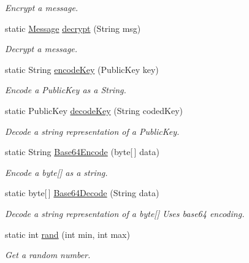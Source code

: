 \begin{DoxyCompactItemize}
\begin{DoxyCompactList}\small\item\em Encrypt a message. \end{DoxyCompactList}\item 
static \hyperlink{classballmerpeak_1_1turtlenet_1_1shared_1_1Message}{Message} \hyperlink{classballmerpeak_1_1turtlenet_1_1server_1_1Crypto_a74c30e340ade0ff1729abe05c772d3f7}{decrypt} (String msg)
\begin{DoxyCompactList}\small\item\em Decrypt a message. \end{DoxyCompactList}\item 
static String \hyperlink{classballmerpeak_1_1turtlenet_1_1server_1_1Crypto_ac3423c536327620f518dab7f55d85b20}{encode\-Key} (Public\-Key key)
\begin{DoxyCompactList}\small\item\em Encode a Public\-Key as a String. \end{DoxyCompactList}\item 
static Public\-Key \hyperlink{classballmerpeak_1_1turtlenet_1_1server_1_1Crypto_a78b5adee9b8deda2f2558fcc9aa3aa4b}{decode\-Key} (String coded\-Key)
\begin{DoxyCompactList}\small\item\em Decode a string representation of a Public\-Key. \end{DoxyCompactList}\item 
static String \hyperlink{classballmerpeak_1_1turtlenet_1_1server_1_1Crypto_a9a8cf56daec604a46eff71fd42b21eef}{Base64\-Encode} (byte\mbox{[}$\,$\mbox{]} data)
\begin{DoxyCompactList}\small\item\em Encode a byte\mbox{[}\mbox{]} as a string. \end{DoxyCompactList}\item 
static byte\mbox{[}$\,$\mbox{]} \hyperlink{classballmerpeak_1_1turtlenet_1_1server_1_1Crypto_a9ff76fd9368082d0e3fa77c9687d8bee}{Base64\-Decode} (String data)
\begin{DoxyCompactList}\small\item\em Decode a string representation of a byte\mbox{[}\mbox{]} Uses base64 encoding. \end{DoxyCompactList}\item 
static int \hyperlink{classballmerpeak_1_1turtlenet_1_1server_1_1Crypto_a226d168b01eb7f6c9b1c5c0984528a41}{rand} (int min, int max)
\begin{DoxyCompactList}\small\item\em Get a random number. \end{DoxyCompactList}\item 

\end{DoxyCompactItemize}
